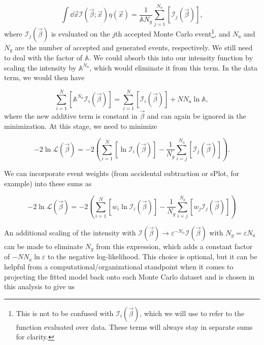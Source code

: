 \begin{equation}
  \int \dd{\vec{x}} \mathcal{I}(\vec{\beta}; \vec{x})\eta(\vec{x}) = \frac{1}{\mathbb{A} N_g} \sum_{j=1}^{N_a} \left[\mathcal{I}_j(\vec{\beta})\right],
\end{equation}
where $\mathcal{I}_j(\vec{\beta})$ is evaluated on the $j$th accepted Monte Carlo event\footnote{This is not to be confused with $\mathcal{I}_i(\vec{\beta})$, which we will use to refer to the function evaluated over data. These terms will always stay in separate sums for clarity.}, and $N_a$ and $N_g$ are the number of accepted and generated events, respectively. We still need to deal with the factor of $\mathbb{A}$. We could absorb this into our intensity function by scaling the intensity by $\mathbb{A}^{N_a}$, which would eliminate it from this term. In the data term, we would then have

\begin{equation}
  \sum_{i=1}^N \left[\mathbb{A}^{N_a}\mathcal{I}_i(\vec{\beta})\right] = \sum_{i=1}^N \left[\mathcal{I}_i(\vec{\beta})\right] + NN_a\ln\mathbb{A},
\end{equation}
where the new additive term is constant in $\vec{\beta}$ and can again be ignored in the minimization. At this stage, we need to minimize

\begin{equation}
  -2\ln\mathcal{L}(\vec{\beta}) = -2\left(\sum_{i=1}^N\left[\ln\mathcal{I}_i(\vec{\beta})\right] - \frac{1}{N_g} \sum_{i=j}^{N_a}\left[\mathcal{I}_j(\vec{\beta})\right]\right).
\end{equation}

We can incorporate event weights (from accidental subtraction or sPlot, for example) into these sums as

\begin{equation}
  -2\ln\mathcal{L}(\vec{\beta}) = -2\left(\sum_{i=1}^N\left[w_i\ln\mathcal{I}_i(\vec{\beta})\right] - \frac{1}{N_g} \sum_{i=j}^{N_a}\left[w_j\mathcal{I}_j(\vec{\beta})\right]\right)
\end{equation}

An additional scaling of the intensity with $\mathcal{I}(\vec{\beta}) \to \varepsilon^{-N_{\alpha}}\mathcal{I}(\vec{\beta})$ with $N_g = \varepsilon N_a$ can be made to eliminate $N_g$ from this expression, which adds a constant factor of $-NN_a\ln\varepsilon$ to the negative log-likelihood. This choice is optional, but it can be helpful from a computational/organizational standpoint when it comes to projecting the fitted model back onto each Monte Carlo dataset and is chosen in this analysis to give us

